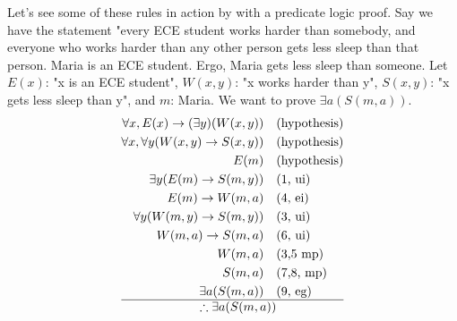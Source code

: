\documentclass[nobib]{tufte-handout}
\begin{document}
Let's see some of these rules in action by with a predicate logic proof.
Say we have the statement "every ECE student works harder
than somebody, and everyone who works harder than any other
person gets less sleep than that person. Maria is an 
ECE student. Ergo, Maria gets less sleep than someone. 
Let $E(x)$: "x is an ECE student", $W(x,y)$: "x works harder than y", 
$S(x,y)$: "x gets less sleep than y", and $m$: Maria. 
We want to prove $\exists a (S(m,a))$. 
\begin{align*}
    \forall x, E(x) \rightarrow (\exists y) (W(x,y)) \quad &\text{(hypothesis)}\\
    \forall x, \forall y (W(x,y) \rightarrow S(x,y)) \quad &\text{(hypothesis)}\\
    E(m) \quad &\text{(hypothesis)}\\
    \exists y (E(m) \rightarrow S(m,y)) \quad &\text{(1, ui)}\\
    E(m) \rightarrow W(m,a) \quad &\text{(4, ei)}\\
    \forall y (W(m,y) \rightarrow S(m,y)) \quad &\text{(3, ui)}\\
    W(m,a) \rightarrow S(m,a) \quad &\text{(6, ui)}\\
    W(m,a) \quad &\text{(3,5 mp)}\\
    S(m,a) \quad &\text{(7,8, mp)}\\
    \exists a (S(m,a)) \quad &\text{(9, eg)}\\
    \hline
    \therefore \exists a (S(m,a)) \notag
\end{align*}
\end{document}
